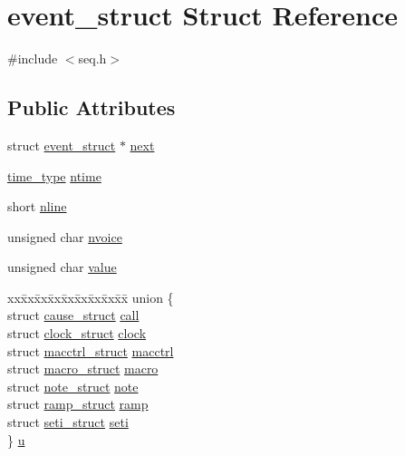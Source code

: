 \hypertarget{structevent__struct}{}\section{event\+\_\+struct Struct Reference}
\label{structevent__struct}


{\ttfamily \#include $<$seq.\+h$>$}

\subsection*{Public Attributes}
\begin{DoxyCompactItemize}
\item 
struct \hyperlink{structevent__struct}{event\+\_\+struct} $\ast$ \hyperlink{structevent__struct_a7bd2f1e72c41332db1d5428d889d56d3}{next}
\item 
\hyperlink{midifns_8h_a3f787491db5dbc75c21b27d54e9ebae6}{time\+\_\+type} \hyperlink{structevent__struct_ab3e215749b836371b7b3e00e5d6c771a}{ntime}
\item 
short \hyperlink{structevent__struct_a356f757e3e9d870b423ccb3e0d3b2c7b}{nline}
\item 
unsigned char \hyperlink{structevent__struct_a0e9d02e921edc61fa27becba1d624d4e}{nvoice}
\item 
unsigned char \hyperlink{structevent__struct_afcefbf02b552912c716669fa2fffb997}{value}
\item 
\begin{tabbing}
xx\=xx\=xx\=xx\=xx\=xx\=xx\=xx\=xx\=\kill
union \{\\
\>struct \hyperlink{structcause__struct}{cause\_struct} \hyperlink{structevent__struct_af175686134558b827dbe2e686890196e}{call}\\
\>struct \hyperlink{structclock__struct}{clock\_struct} \hyperlink{structevent__struct_aa7356ebe86a978c9901f24c35680e6d8}{clock}\\
\>struct \hyperlink{structmacctrl__struct}{macctrl\_struct} \hyperlink{structevent__struct_a4bc36bc9c07a3509e68c385b2d0706af}{macctrl}\\
\>struct \hyperlink{structmacro__struct}{macro\_struct} \hyperlink{structevent__struct_a48f2d877f0cdb494754971cfac040bb5}{macro}\\
\>struct \hyperlink{unionnote__struct}{note\_struct} \hyperlink{structevent__struct_a3b05f65218a1caa9d02406871fb58954}{note}\\
\>struct \hyperlink{structramp__struct}{ramp\_struct} \hyperlink{structevent__struct_a6746759ac548337e4648bc979716cebe}{ramp}\\
\>struct \hyperlink{structseti__struct}{seti\_struct} \hyperlink{structevent__struct_a20dfe512ec6949208fc4b9a52380d53a}{seti}\\
\} \hyperlink{structevent__struct_a60cb93d3e3c595ac444342c496e97d71}{u}\\

\end{tabbing}\end{DoxyCompactItemize}


